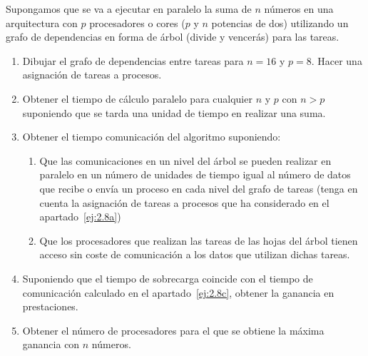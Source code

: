 \begin{ejercicio}
    Supongamos que se va a ejecutar en paralelo la suma de $n$ números en una arquitectura con $p$ procesadores o cores ($p$ y $n$ potencias de dos) utilizando un grafo de dependencias en forma de árbol (divide
    y vencerás) para las tareas.
    \begin{enumerate}
        \item\label{ej:2.8a} Dibujar el grafo de dependencias entre tareas para $n=16$ y $p=8$. Hacer una asignación de tareas
        a procesos.
        \item Obtener el tiempo de cálculo paralelo para cualquier $n$ y $p$ con $n>p$ suponiendo que se tarda una
        unidad de tiempo en realizar una suma.
        \item\label{ej:2.8c} Obtener el tiempo comunicación del algoritmo suponiendo:
        \begin{enumerate}
            \item Que las comunicaciones en un nivel del árbol se pueden realizar en paralelo en un número de unidades de tiempo igual al número de
            datos que recibe o envía un proceso en cada nivel del grafo de tareas (tenga en cuenta la asignación
            de tareas a procesos que ha considerado en el apartado~\ref{ej:2.8a})
            \item Que los procesadores que realizan las tareas de las hojas del árbol tienen acceso sin coste de comunicación a los datos que utilizan
            dichas tareas.
        \end{enumerate}

        \item Suponiendo que el tiempo de sobrecarga coincide con el tiempo de comunicación calculado en el apartado~\ref{ej:2.8c}, obtener la ganancia en prestaciones.
        \item Obtener el número de procesadores para el que se obtiene la máxima ganancia con $n$ números.
    \end{enumerate}


\end{ejercicio}
